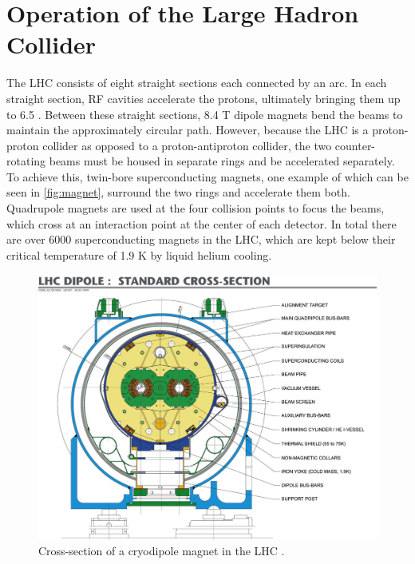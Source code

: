 \section{Operation of the Large Hadron Collider}

The \ac{LHC} consists of eight straight sections each connected by an arc. In each straight section, \ac{RF} cavities accelerate the protons, ultimately bringing them up to 6.5 \gev. Between these straight sections, 8.4 T dipole magnets bend the beams to maintain the approximately circular path. However, because the \ac{LHC} is a proton-proton collider as opposed to a proton-antiproton collider, the two counter-rotating beams must be housed in separate rings and be accelerated separately. To achieve this, twin-bore superconducting magnets, one example of which can be seen in \autoref{fig:magnet}, surround the two rings and accelerate them both. Quadrupole magnets are used at the four collision points to focus the beams, which cross at an interaction point at the center of each detector. In total there are over 6000 superconducting magnets in the \ac{LHC}, which are kept below their critical temperature of 1.9 K by liquid helium cooling. 

\begin{centering}
\begin{figure}[!hbt]
\myfloatalign
\includegraphics[width=.90\linewidth]{figures/lhc/magnet.jpg}
\caption{Cross-section of a cryodipole magnet in the \ac{LHC} \cite{1748-0221-3-08-S08001}.}
\label{fig:magnet}
\end{figure}
\end{centering}

